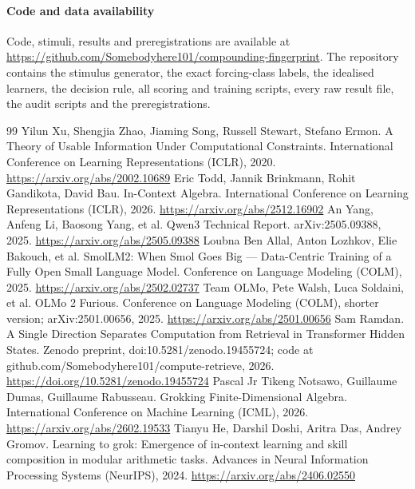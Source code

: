 \documentclass[11pt]{article}
\begin{document}
\paragraph{Code and data availability}

Code, stimuli, results and preregistrations are available at \url{https://github.com/Somebodyhere101/compounding-fingerprint}. The repository contains the stimulus generator, the exact forcing-class labels, the idealised learners, the decision rule, all scoring and training scripts, every raw result file, the audit scripts and the preregistrations.

\begin{thebibliography}{99}
\small
{} Yilun Xu, Shengjia Zhao, Jiaming Song, Russell Stewart, Stefano Ermon. \newblock A Theory of Usable Information Under Computational Constraints. \newblock International Conference on Learning Representations (ICLR), 2020. \newblock \url{https://arxiv.org/abs/2002.10689}
 Eric Todd, Jannik Brinkmann, Rohit Gandikota, David Bau. \newblock In-Context Algebra. \newblock International Conference on Learning Representations (ICLR), 2026. \newblock \url{https://arxiv.org/abs/2512.16902}
 An Yang, Anfeng Li, Baosong Yang, et al. \newblock Qwen3 Technical Report. \newblock arXiv:2505.09388, 2025. \newblock \url{https://arxiv.org/abs/2505.09388}
 Loubna Ben Allal, Anton Lozhkov, Elie Bakouch, et al. \newblock SmolLM2: When Smol Goes Big --- Data-Centric Training of a Fully Open Small Language Model. \newblock Conference on Language Modeling (COLM), 2025. \newblock \url{https://arxiv.org/abs/2502.02737}
 Team OLMo, Pete Walsh, Luca Soldaini, et al.  OLMo 2 Furious. \newblock Conference on Language Modeling (COLM), shorter version; arXiv:2501.00656, 2025. \newblock \url{https://arxiv.org/abs/2501.00656}
 Sam Ramdan. \newblock A Single Direction Separates Computation from Retrieval in Transformer Hidden States. \newblock Zenodo preprint, doi:10.5281/zenodo.19455724; code at github.com/Somebodyhere101/compute-retrieve, 2026. \newblock \url{https://doi.org/10.5281/zenodo.19455724}
 Pascal Jr Tikeng Notsawo, Guillaume Dumas, Guillaume Rabusseau. \newblock Grokking Finite-Dimensional Algebra. \newblock International Conference on Machine Learning (ICML), 2026. \newblock \url{https://arxiv.org/abs/2602.19533}
 Tianyu He, Darshil Doshi, Aritra Das, Andrey Gromov. \newblock Learning to grok: Emergence of in-context learning and skill composition in modular arithmetic tasks. \newblock Advances in Neural Information Processing Systems (NeurIPS), 2024. \newblock \url{https://arxiv.org/abs/2406.02550}

\end{thebibliography}
\end{document}
